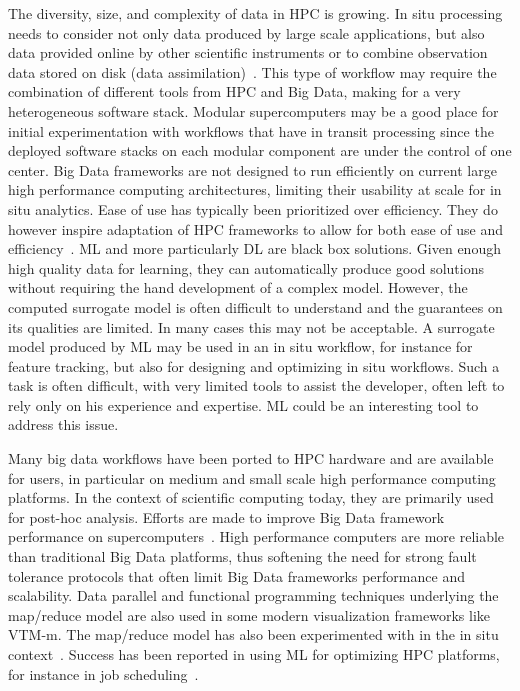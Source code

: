 \begin{refsection}
The diversity, size, and complexity of data in HPC is growing. 
In situ processing needs to consider not only data produced by large scale applications, but also data provided online by other scientific instruments or to combine observation data stored on disk (data assimilation)~\cite{Asch18}. 
This type of workflow may require the combination of different tools from HPC and Big Data, making for a very heterogeneous software stack. 
Modular supercomputers may be a good place for initial experimentation with workflows that have in transit processing since the deployed software stacks on each modular component are under the control of one center.
Big Data frameworks are not designed to run efficiently on current large high performance computing architectures, limiting their usability at scale for in situ analytics. 
Ease of use has typically been prioritized over efficiency. They do however inspire adaptation of HPC frameworks to allow for both ease of use and efficiency~\cite{Plimpton11}.
ML and more particularly DL are black box solutions. 
Given enough high quality data for learning, they can automatically produce good solutions without requiring the hand development of a complex model.
However, the  computed surrogate model is often difficult to understand and the guarantees on its qualities are limited. 
In many cases this may not be acceptable. 
A surrogate model produced by ML may be used in an in situ workflow, for instance for feature tracking, but also for designing and optimizing in situ workflows. 
Such a task is often  difficult, with very limited tools to assist the developer, often left to rely only on his experience and expertise. 
ML could be an interesting tool to address this issue.

Many big data workflows have been ported to HPC hardware and are available for users, in particular on medium and small scale high performance computing platforms. 
In the context of scientific computing today, they are primarily used for post-hoc analysis. 
Efforts are made to improve Big Data framework performance on supercomputers~\cite{Plimpton11}. 
High performance computers are more reliable than traditional Big Data platforms, thus softening the need for strong fault tolerance protocols that often limit Big Data frameworks performance and scalability. 
Data parallel and functional programming techniques underlying the map/reduce model are also used in some modern visualization frameworks like VTM-m. 
The map/reduce model has also been experimented with in the in situ context~\cite{Wang15}.
Success has been reported in using ML for optimizing HPC platforms, for instance in job scheduling~\cite{Carastan-Santos17}.



\end{refsection}
